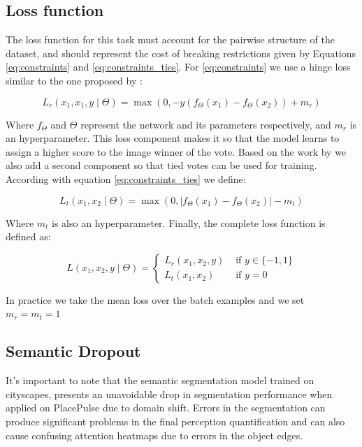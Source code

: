 \subsection{Loss function} \label{section:loss}
The loss function for this task must account for the pairwise structure of the dataset,
and should represent the cost of breaking restrictions given by Equations
\ref{eq:constraints} and \ref{eq:constraints_ties}. For \ref{eq:constraints} we use
a hinge loss similar to the one proposed by :

\begin{equation}
	L_r(x_1,x_1,y \mid \Theta) = \max(0, -y(f_\Theta(x_1) - f_\Theta(x_2)) + m_r)
	\label{eq:r_loss}
\end{equation}

Where $f_\Theta$ and $\Theta$  represent the network and its parameters respectively, and $m_r$
is an hyperparameter. This loss component makes it so that the model learns to assign a higher
score to the image winner of the vote. Based on the work by  we also add a second component so that tied votes can
be used for training. According with equation \ref{eq:constraints_ties} we define:

\begin{equation}
	L_t(x_1,x_2 \mid \Theta) = \max(0, |f_\Theta(x_1) - f_\Theta(x_2)| - m_t)
	\label{eq:t_loss}
\end{equation}

Where $m_t$ is also an hyperparameter. Finally, the complete loss function is defined as:

\begin{equation}
	L(x_1,x_2,y \mid \Theta) =\left\{\begin{matrix}
		L_r(x_1,x_2,y)&\text{ if } y \in \{-1,1\} \\
		L_t(x_1,x_2)&\text{ if } y=0
	\end{matrix}\right.
\end{equation}

In practice we take the mean loss over the batch examples and we set $m_r=m_t=1$

\subsection{Semantic Dropout}
It's important to note that the semantic segmentation model trained on cityscapes,
presents an unavoidable drop in segmentation performance when applied on PlacePulse
due to domain shift. Errors in the segmentation can produce  significant problems
in the final perception quantification and can also cause confusing
attention heatmaps due to errors in the object edges.

